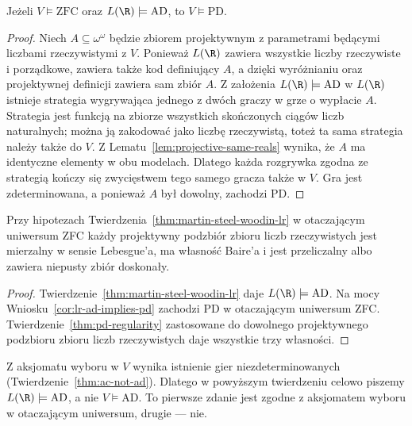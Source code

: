 \begin{wniosek}
\label{cor:lr-ad-implies-pd}
Jeżeli $V\models\mathrm{ZFC}$ oraz
$L(\R)\models\mathrm{AD}$, to $V\models\mathrm{PD}$.
\end{wniosek}
\begin{proof}
Niech $A\subseteq\omega^\omega$ będzie zbiorem
projektywnym z parametrami będącymi liczbami
rzeczywistymi z $V$. Ponieważ $L(\R)$ zawiera
wszystkie liczby rzeczywiste i porządkowe,
zawiera także kod definiujący $A$, a dzięki
wyróżnianiu oraz projektywnej definicji zawiera
sam zbiór $A$.
Z założenia $L(\R)\models\mathrm{AD}$
w $L(\R)$ istnieje strategia wygrywająca jednego
z dwóch graczy w grze o wypłacie $A$. Strategia
jest funkcją na zbiorze wszystkich skończonych
ciągów liczb naturalnych; można ją zakodować
jako liczbę rzeczywistą, toteż ta sama strategia
należy także do $V$. Z Lematu~\ref{lem:projective-same-reals}
wynika, że $A$ ma identyczne elementy w obu
modelach. Dlatego każda rozgrywka zgodna ze
strategią kończy się zwycięstwem tego samego
gracza także w $V$. Gra jest zdeterminowana,
a ponieważ $A$ był dowolny, zachodzi PD.
\end{proof}

\begin{wniosek}
\label{cor:woodin-projective-regularity}
Przy hipotezach Twierdzenia~\ref{thm:martin-steel-woodin-lr}
w otaczającym uniwersum ZFC każdy projektywny
podzbiór zbioru liczb rzeczywistych jest
mierzalny w sensie Lebesgue'a, ma własność
Baire'a i jest przeliczalny albo zawiera
niepusty zbiór doskonały.
\end{wniosek}
\begin{proof}
Twierdzenie~\ref{thm:martin-steel-woodin-lr}
daje $L(\R)\models\mathrm{AD}$. Na mocy
Wniosku~\ref{cor:lr-ad-implies-pd} zachodzi
PD w otaczającym uniwersum ZFC.
Twierdzenie~\ref{thm:pd-regularity} zastosowane
do dowolnego projektywnego podzbioru zbioru
liczb rzeczywistych daje wszystkie trzy własności.
\end{proof}

\begin{uwaga}
Z aksjomatu wyboru w $V$ wynika istnienie
gier niezdeterminowanych
(Twierdzenie~\ref{thm:ac-not-ad}).
Dlatego w powyższym twierdzeniu celowo
piszemy $L(\R)\models\mathrm{AD}$, a nie
$V\models\mathrm{AD}$. To pierwsze zdanie jest
zgodne z aksjomatem wyboru w otaczającym
uniwersum, drugie — nie.
\end{uwaga}


